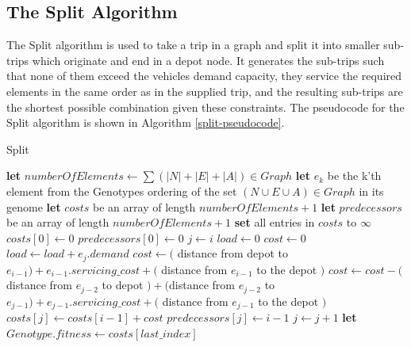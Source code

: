 
\subsection{The Split Algorithm} %
\label{sub:the_split_algorithm}

The Split algorithm is used to take a trip in a graph and split it into smaller sub-trips which originate and end in a depot node. It generates the sub-trips such that none of them exceed the vehicles demand capacity, they service the required elements in the same order as in the supplied trip, and the resulting sub-trips are the shortest possible combination given these constraints. The pseudocode for the Split algorithm is shown in Algorithm \ref{split-pseudocode}.

\begin{algorithm}[thbp]
\caption{Split}\label{split-pseudocode}
\begin{algorithmic}[1]

	\State \textbf{let} $numberOfElements \leftarrow \sum (|N|+|E|+|A|) \in Graph$
	\State \textbf{let} $e_k$ be the k'th element from the Genotypes ordering of the set $(N \cup E \cup A) \in Graph$ in its genome
	\State \textbf{let} $costs$ be an array of length $numberOfElements + 1$
	\State \textbf{let} $predecessors$ be an array of length $numberOfElements + 1$
	\State \textbf{set} all entries in $costs$ to $\infty$
	\State $costs[0] \leftarrow 0$
	\State $predecessors[0] \leftarrow 0$
	\Statex
		\State $j \leftarrow i$
		\State $load \leftarrow 0$
		\State $cost \leftarrow 0$
		\DoWhile
			\State $load \leftarrow load + e_j.demand$
			\Statex
				\State $cost \leftarrow($ distance from depot to $e_{i-1}) + e_{i-1}.servicing\_cost +($ distance from $e_{i-1}$ to the depot $)$
			\Else
				\State $cost \leftarrow  cost - ($ distance from $e_{j-2}$ to depot $) + ($distance from $e_{j-2}$ to $e_{j-1}) + e_{j-1}.servicing\_cost +($ distance from $e_{j-1}$ to the depot $)$
			\EndIf
			\Statex
				\State $costs[j] \leftarrow costs[i - 1] + cost$
				\State $predecessors[j] \leftarrow i - 1$
			\EndIf
			\Statex
			\State $j \leftarrow j + 1$
	\EndFor
	\Statex
	\State \textbf{let} $Genotype.fitness \leftarrow costs[last\_index]$
\EndProcedure

\end{algorithmic}
\end{algorithm}

